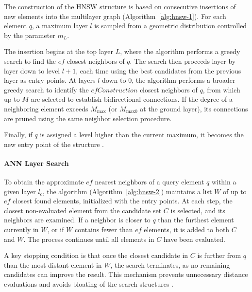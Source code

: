 The construction of the HNSW structure is based on consecutive insertions of new elements into the multilayer graph (Algorithm~\ref{alg:hnsw-1}). For each element $q$, a maximum layer $l$ is sampled from a geometric distribution controlled by the parameter $m_L$.

The insertion begins at the top layer $L$, where the algorithm performs a greedy search to find the $ef$ closest neighbors of $q$. The search then proceeds layer by layer down to level $l + 1$, each time using the best candidates from the previous layer as entry points. At layers $l$ down to $0$, the algorithm performs a broader greedy search to identify the $efConstruction$ closest neighbors of $q$, from which up to $M$ are selected to establish bidirectional connections. If the degree of a neighboring element exceeds $M_{\text{max}}$ (or $M_{\text{max0}}$ at the ground layer), its connections are pruned using the same neighbor selection procedure.

Finally, if $q$ is assigned a level higher than the current maximum, it becomes the new entry point of the structure \cite{Malkov-Yashunin-2016}.



\paragraph{ANN Layer Search}

To obtain the approximate $ef$ nearest neighbors of a query element $q$ within a given layer $l_c$, the algorithm (Algorithm~\ref{alg:hnsw-2}) maintains a list $W$ of up to $ef$ closest found elements, initialized with the entry points. At each step, the closest non-evaluated element from the candidate set $C$ is selected, and its neighbors are examined. If a neighbor is closer to $q$ than the furthest element currently in $W$, or if $W$ contains fewer than $ef$ elements, it is added to both $C$ and $W$. The process continues until all elements in $C$ have been evaluated.

A key stopping condition is that once the closest candidate in $C$ is further from $q$ than the most distant element in $W$, the search terminates, as no remaining candidates can improve the result. This mechanism prevents unnecessary distance evaluations and avoids bloating of the search structures \cite{Malkov-Yashunin-2016}.



